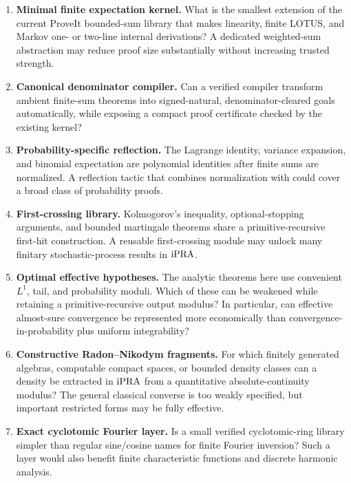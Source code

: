 \begin{enumerate}
\item \textbf{Minimal finite expectation kernel.}
  What is the smallest extension of the current ProveIt bounded-sum library
  that makes linearity, finite LOTUS, and Markov one- or two-line internal
  derivations?  A dedicated weighted-sum abstraction may reduce proof size
  substantially without increasing trusted strength.

\item \textbf{Canonical denominator compiler.}
  Can a verified compiler transform ambient  finite-sum theorems
  into signed-natural, denominator-cleared  goals automatically,
  while exposing a compact proof certificate checked by the existing kernel?

\item \textbf{Probability-specific reflection.}
  The Lagrange identity, variance expansion, and binomial expectation are
  polynomial identities after finite sums are normalized.  A reflection
  tactic that combines  normalization with 
  could cover a broad class of probability proofs.

\item \textbf{First-crossing library.}
  Kolmogorov's inequality, optional-stopping arguments, and bounded martingale
  theorems share a primitive-recursive first-hit construction.  A reusable
  first-crossing module may unlock many finitary stochastic-process results in
  \(\mathrm{iPRA}\).

\item \textbf{Optimal effective hypotheses.}
  The analytic theorems here use convenient \(L^1\), tail, and probability
  moduli.  Which of these can be weakened while retaining a primitive-recursive
  output modulus?  In particular, can effective almost-sure convergence be
  represented more economically than convergence-in-probability plus uniform
  integrability?

\item \textbf{Constructive Radon--Nikodym fragments.}
  For which finitely generated algebras, computable compact spaces, or bounded
  density classes can a density be extracted in \(\mathrm{iPRA}\) from a quantitative
  absolute-continuity modulus?  The general classical converse is too weakly
  specified, but important restricted forms may be fully effective.

\item \textbf{Exact cyclotomic Fourier layer.}
  Is a small verified cyclotomic-ring library simpler than regular sine/cosine
  names for finite Fourier inversion?  Such a layer would also benefit finite
  characteristic functions and discrete harmonic analysis.


\end{enumerate}
